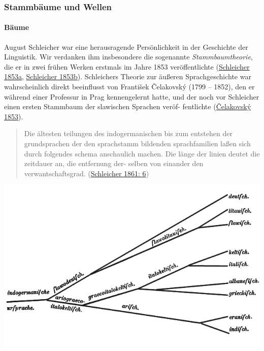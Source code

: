 \subsubsection{Stammbäume und Wellen}

\paragraph{Bäume}

August Schleicher war eine herausragende Persönlichkeit in der
Geschichte der Linguistik. Wir verdanken ihm insbesondere die sogenannte
\emph{Stammbaumtheorie}, die er in zwei frühen Werken erstmals im Jahre
1853 veröffentlichte
(\href{http://bibliography.lingpy.org?key=Schleicher1853}{Schleicher
1853a},
\href{http://bibliography.lingpy.org?key=Schleicher1853a}{Schleicher
1853b}). Schleichers Theorie zur äußeren Sprachgeschichte war
wahrscheinlich direkt beeinflusst von František Čelakovský (1799 --
1852), den er während einer Professur in Prag kennengelernt hatte, und
der noch vor Schleicher einen ersten Stammbaum der slawischen Sprachen
veröf- fentlichte
(\href{http://bibliography.lingpy.org?key=Celakovsky1853}{Čelakovský
1853}).






\begin{quote}
Die ältesten teilungen des indogermanischen bis zum entstehen der
grundsprachen der den sprachstamm bildenden sprachfamilien laßen sich
durch folgendes schema anschaulich machen. Die länge der linien deutet
die zeitdauer an, die entfernung der- selben von einander den
verwantschaftsgrad.
(\href{http://bibliography.lingpy.org?key=Schleicher1861}{Schleicher
1861: 6})
\end{quote}






\href{img/schleicher1861.jpg}{\includegraphics[width=\textwidth]{img/schleicher1861.jpg}}

